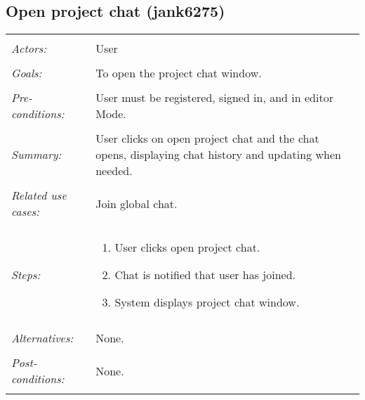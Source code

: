 \subsection{Open project chat (jank6275)}
\begin{tabular}{ p{2cm} p{12cm} }
 \hline
 \\
 \textit{Actors:} & User \\ 
 \\
 \textit{Goals:} & To open the project chat window. \\
 \\
 \textit{Pre-conditions:} & User must be registered, signed in, and in editor Mode.  \\
 \\
 \textit{Summary:} & User clicks on open project chat and the chat opens, displaying chat history and updating when needed. \\ 
 \\
 \textit{Related use cases:} & Join global chat. \\ 
 \\
 \textit{Steps:} & \begin{enumerate}
  \item User clicks open project chat.
  \item Chat is notified that user has joined.
  \item System displays project chat window.
 \end{enumerate} \\
 \\
 \textit{Alternatives:} & None. \\
 \\
 \textit{Post-conditions:} & None. \\
 \\
\hline
\end{tabular}

